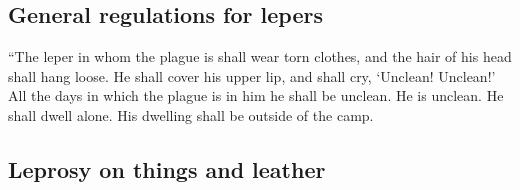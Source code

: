 \hypertarget{general-regulations-for-lepers}{%
\subsection{General regulations for
lepers}\label{general-regulations-for-lepers}}

 ``The leper in whom the plague is shall wear torn
clothes, and the hair of his head shall hang loose. He shall cover his
upper lip, and shall cry, `Unclean! Unclean!'  All the
days in which the plague is in him he shall be unclean. He is unclean.
He shall dwell alone. His dwelling shall be outside of the camp.

\hypertarget{leprosy-on-things-and-leather}{%
\subsection{Leprosy on things and
leather}\label{leprosy-on-things-and-leather}}

